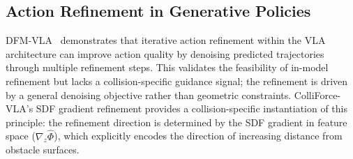 \subsection{Action Refinement in Generative Policies}

DFM-VLA~\cite{chen2026dfmvla} demonstrates that iterative action refinement within the VLA architecture can improve action quality by denoising predicted trajectories through multiple refinement steps. This validates the feasibility of in-model refinement but lacks a collision-specific guidance signal; the refinement is driven by a general denoising objective rather than geometric constraints. ColliForce-VLA's SDF gradient refinement provides a collision-specific instantiation of this principle: the refinement direction is determined by the SDF gradient in feature space ($\nabla_z \hat{\Phi}$), which explicitly encodes the direction of increasing distance from obstacle surfaces.